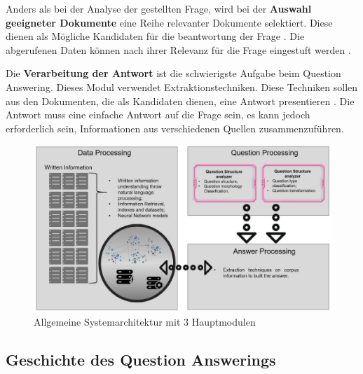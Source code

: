 \documentclass[
        ngerman,
        paper=a4,
        numbers=noendperiod,
]{scrreprt}
\begin{document}
Anders als bei der Analyse der gestellten Frage, wird bei der \textbf{Auswahl geeigneter Dokumente} eine Reihe relevanter Dokumente selektiert. Diese dienen als Mögliche Kandidaten für die beantwortung der Frage \cite{Malik2013DomainSystem}. Die abgerufenen Daten können nach ihrer Relevanz für die Frage eingestuft werden \citep{Neves2015QuestionBiology}. 

Die \textbf{Verarbeitung der Antwort} ist die schwierigste Aufgabe beim Question Answering. Dieses Modul verwendet Extraktionstechniken. Diese Techniken sollen aus den Dokumenten, die als Kandidaten dienen, eine Antwort presentieren \citep{Bhoir2014QuestionApproach}. Die Antwort muss eine einfache Antwort auf die Frage sein, es kann jedoch erforderlich sein, Informationen aus verschiedenen Quellen zusammenzuführen.

\begin{figure}[H]
    \centering\includegraphics[width=1\linewidth]{images/arch.png}
    \caption[Allgemeine Systemarchitektur mit 3 Hauptmodulen]{Allgemeine Systemarchitektur mit 3 Hauptmodulen \cite [S. 3]{CalijorneSoares2018ASystems}}
    \label{fig:architektur}
\end{figure}
\subsection{Geschichte des Question Answerings}

%
\end{document}
